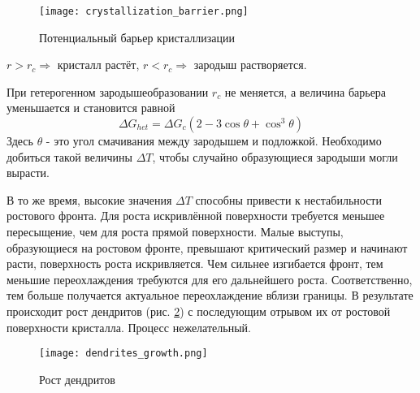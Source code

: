 \begin{figure}[h!]
\centering
\texttt{[image: crystallization\_barrier.png]}\caption{Потенциальный барьер кристаллизации} \label{fig:crystallization_barrier}
\end{figure}
$r>r_c \Rightarrow$ кристалл растёт, $r<r_c \Rightarrow$ зародыш растворяется.
\par При гетерогенном зародышеобразовании $r_c$ не меняется, а величина барьера уменьшается и становится равной
\begin{equation}
\Delta G_{het} = \Delta G_c (2-3\cos \theta + \cos^3\theta)
\label{eq:heterocrystallization_energy_barrier}  
\end{equation}
Здесь $\theta$ - это угол смачивания между зародышем и подложкой. Необходимо добиться такой величины $\Delta T$, чтобы случайно образующиеся зародыши могли вырасти.
\par
В то же время, высокие значения $\Delta T$ способны привести к нестабильности ростового фронта. Для роста искривлённой поверхности требуется меньшее пересыщение, чем для роста прямой поверхности. Малые выступы, образующиеся на ростовом фронте, превышают критический размер и начинают расти, поверхность роста искривляется. Чем сильнее изгибается фронт, тем меньшие переохлаждения требуются для его дальнейшего роста. Соответственно, тем больше получается актуальное переохлаждение вблизи границы. В результате происходит рост дендритов (рис. \ref{fig:dendrites_growth}) с последующим отрывом их от ростовой поверхности кристалла. Процесс нежелательный.
\begin{figure}[h!]
\centering
\texttt{[image: dendrites\_growth.png]}\caption{Рост дендритов} \label{fig:dendrites_growth}
\end{figure}
